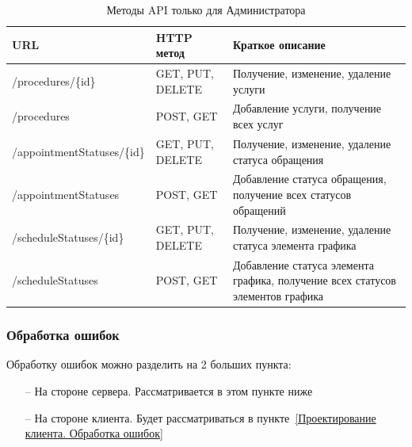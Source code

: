 \documentclass[a4paper,article]{article}
\begin{document}
\begin{sloppypar}
    \newpage

    \begin{xltabular}{\textwidth} { |
        >{\hsize} X |
        >{\hsize} X |
        >{\hsize} X | }
        \caption{\centering Методы API только для Администратора}
        \label{tab:Методы API только для Администатора} \\

        \hline
        URL
        & HTTP метод
        & Краткое описание \\

        \hline
        /procedures/\{id\}
        & GET, PUT, DELETE
        & Получение, изменение, удаление услуги \\

        \hline
        /procedures
        & POST, GET
        & Добавление услуги, получение всех услуг \\

        \hline
        /appointmentStatuses/\{id\}
        & GET, PUT, DELETE
        & Получение, изменение, удаление статуса обращения \\

        \hline
        /appointmentStatuses
        & POST, GET
        & Добавление статуса обращения, получение всех статусов обращений \\

        \hline
        /scheduleStatuses/\{id\}
        & GET, PUT, DELETE
        & Получение, изменение, удаление статуса элемента графика \\

        \hline
        /scheduleStatuses
        & POST, GET
        & Добавление статуса элемента графика, получение всех статусов элементов графика \\

        \hline
    \end{xltabular}

    \subsubsection{Обработка ошибок}\label{Проектирование сервера. Обработка ошибок}

    Обработку ошибок можно разделить на 2 больших пункта:

    \begin{itemize}[nolistsep]
        \item[--] На стороне сервера. Рассматривается в этом пункте ниже
        \item[--] На стороне клиента. Будет рассматриваться в пункте~\ref{Проектирование клиента. Обработка ошибок}
    \end{itemize}


\end{sloppypar}
\end{document}
